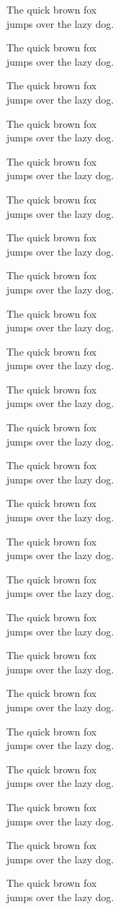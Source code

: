 
\parindent0pt



\newcommand{\TESTERLI}{
{\Huge

The quick brown fox \\
jumps over the lazy dog.

\begin{center}
The quick brown fox \\
jumps over the lazy dog.
\end{center}

\begin{flushright}
The quick brown fox \\
jumps over the lazy dog.
\end{flushright}

}}

\TESTERLI
\vfill
\TESTERLI
\newpage

\TESTERLI
\vfill
\TESTERLI
\newpage

\TESTERLI
\vfill
\TESTERLI
\newpage

\TESTERLI
\vfill
\TESTERLI
\newpage



